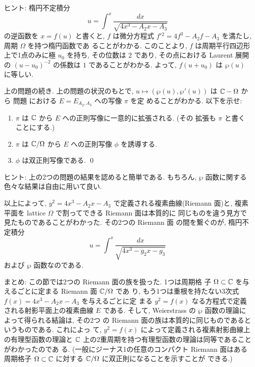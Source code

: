 \documentclass[12pt,twoside]{jarticle}
\def\setminus{-}
\def\pe{\wp}
\def\C{{\Bbb C}} %
\begin{document}
\noindent ヒント: 楕円不定積分
\[
  u = \int^x \frac{dx}{\sqrt{4x^3-A_2x-A_3}}
\]
の逆函数を $x = f(u)$ と書くと, $f$ は微分方程式 %
$f'{}^2=4f^3-A_2f-A_3$ を満たし, 周期 $\Omega$ を持つ楕円函数であ
ることがわかる. このことより, $f$ は周期平行四辺形上で1点のみに極 $u_0$ %
を持ち, その位数は $2$ であり, その点における Laurent 展開の %
$(u-u_0)^{-2}$ の係数は $1$ であることがわかる. よって, $f(u+u_0)$ は %
$\pe(u)$ に等しい.

\begin{question}\qstar{*}
  上の問題の続き. 上の問題の状況のもとで, %
  $u\mapsto(\pe(u),\pe'(u))$ は $\C\setminus\Omega$ から
  問題  における $E=E_{A_2,A_3}$ への写像 $\pi$ を定
  めることがわかる. 以下を示せ:
  \begin{enumerate}
  \item $\pi$ は $\C$ から $E$ への正則写像に一意的に拡張される. (その
    拡張も $\pi$ と書くことにする.)
  \item $\pi$ は $\C/\Omega$ から $E$ への正則写像 $\phi$ を誘導する.
  \item $\phi$ は双正則写像である. \qed
  \end{enumerate}
\end{question}

\noindent ヒント: 上の2つの問題の結果を認めると簡単である. もちろん, %
$\pe$ 函数に関する色々な結果は自由に用いて良い.

\medskip

以上によって, $y^2 = 4x^3 - A_2 x - A_3$ で定義される複素曲線(Riemann 
面)と, 複素平面を lattice $\Omega$ で割ってできる Riemann 面は本質的に
同じものを違う見方で見たものであることがわかった. その2つの Riemann 面
の間を繋ぐのが, 楕円不定積分
\[
  u = \int^x \frac{dx}{\sqrt{4x^3 - g_2 x - g_3}}
\]
および $\pe$ 函数なのである.


\bigskip

\noindent まとめ: この節では2つの Riemann 面の族を扱った. 1つは周期格
子 $\Omega\subset\C$ を与えるごとに定まる Riemann 面 $\C/\Omega$ であ
り, もう1つは重根を持たない3次式 $f(x)=4x^3-A_2x-A_3$ を与えるごとに定
まる $y^2=f(x)$ なる方程式で定義される射影平面上の複素曲線 $E$ である. 
そして, Weierstrass の $\pe$ 函数の理論によって得られる結論は, その2つ
の Riemann 面の族は本質的に同じものであるというものである. これによっ
て, $y^2=f(x)$ によって定義される複素射影曲線上の有理型函数の理論と %
$\C$ 上の2重周期を持つ有理型函数の理論は同等であることがわかったのであ
る. (一般にジーナス1の任意のコンパクト Riemann 面はある周期格子 
$\Omega\subset\C$ に対する $\C/\Omega$ に双正則になることを示すことが
できる.)
\end{document}

